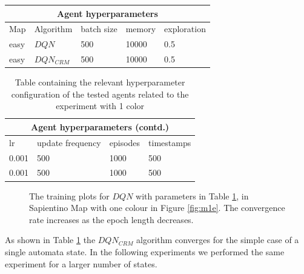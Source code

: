 \documentclass{article}
\begin{document}
\begin{table}[h!]
\centering
\begin{tabular}{|p{1cm}|p{2cm}|p{1cm}|p{1.2cm}|p{1.7cm}||}
 \hline
 \multicolumn{5}{|c|}{Agent hyperparameters} \\
 \hline
 Map & Algorithm & batch size & memory & exploration \\
 \hline
 easy & $DQN$ & 500 & 10000 & 0.5 \\
 \hline
 easy & $DQN_{CRM}$ & 500 & 10000 & 0.5 \\
\hline
\end{tabular}
\end{table}
\begin{table}[h!]
\centering
\begin{tabular}{||p{0.8cm}|p{1cm}|p{1.2cm}|p{1.7cm}| }
 \hline
 \multicolumn{4}{|c|}{Agent hyperparameters (contd.)} \\
    \hline
    lr & update frequency & episodes & timestamps\\
    \hline
    0.001 & 500 & 1000 & 500 \\
    \hline
    0.001 & 500 & 1000 & 500 \\
\hline
\end{tabular}
\caption{Table containing the relevant hyperparameter configuration of the tested agents related to the experiment with 1 color}\label{tab:t1e}
\end{table}
\begin{figure}[h!]
  \centering
  \hfill
  \caption{The training plots for  $DQN$ with parameters in Table \ref{tab:t1e}, in Sapientino Map with one colour in Figure \ref{fig:m1e}. The convergence rate increases as the epoch length decreases.}\label{fig:p1e}
\end{figure}
As shown in Table \ref{fig:p1e} the $DQN_{CRM}$ algorithm converges for the simple case of a single automata state. In the following experiments we performed the same experiment for a larger number of states.
\end{document}
